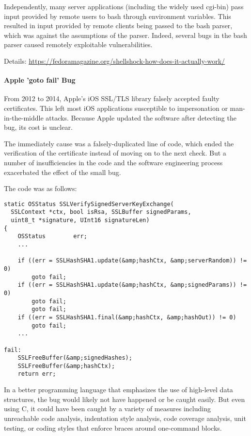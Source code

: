 
Independently, many server applications (including the widely used cgi-bin) pass input provided by remote users to bash through environment variables.
This resulted in input provided by remote clients being passed to the bash parser, which was against the assumptions of the parser.
Indeed, several bugs in the bash parser caused remotely exploitable vulnerabilities.

Details: \url{https://fedoramagazine.org/shellshock-how-does-it-actually-work/}

\paragraph{Apple 'goto fail' Bug}
From 2012 to 2014, Apple's iOS SSL/TLS library falsely accepted faulty certificates.
This left most iOS applications susceptible to impersonation or man-in-the-middle attacks.
Because Apple updated the software after detecting the bug, its cost is unclear.

The immediately cause was a falsely-duplicated line of code, which ended the verification of the certificate instead of moving on to the next check.
But a number of insufficiencies in the code and the software engineering process exacerbated the effect of the small bug.

The code was as follows:

\begin{lstlisting}
static OSStatus SSLVerifySignedServerKeyExchange(
  SSLContext *ctx, bool isRsa, SSLBuffer signedParams,
  uint8_t *signature, UInt16 signatureLen)
{
	OSStatus        err;
	...

	if ((err = SSLHashSHA1.update(&amp;hashCtx, &amp;serverRandom)) != 0)
		goto fail;
	if ((err = SSLHashSHA1.update(&amp;hashCtx, &amp;signedParams)) != 0)
		goto fail;
		goto fail;
	if ((err = SSLHashSHA1.final(&amp;hashCtx, &amp;hashOut)) != 0)
		goto fail;
	...

fail:
	SSLFreeBuffer(&amp;signedHashes);
	SSLFreeBuffer(&amp;hashCtx);
	return err;
\end{lstlisting}

In a better programming language that emphasizes the use of high-level data structures, the bug would likely not have happened or be caught easily.
But even using C, it could have been caught by a variety of measures including unreachable code analysis, indentation style analysis, code coverage analysis, unit testing, or coding styles that enforce braces around one-command blocks.
 
